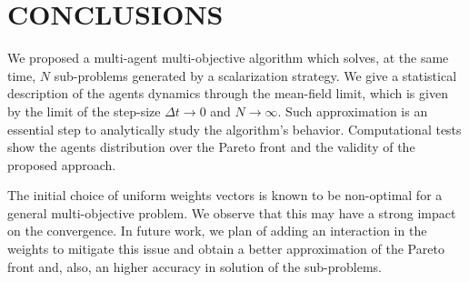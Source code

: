 \documentclass[letterpaper, 10 pt, conference]{ieeeconf}  %
\begin{document}
\section{CONCLUSIONS}
We proposed a multi-agent multi-objective algorithm which solves, at the same time, $N$ sub-problems generated by a scalarization strategy. We give a statistical description of the agents dynamics through the mean-field limit, which is given by the limit of the step-size $\Delta t \to 0$ and $N \to \infty$. Such approximation is an essential step to analytically study the algorithm's behavior.
Computational tests show the agents distribution over the Pareto front and the validity of the proposed approach.

The initial choice of uniform weights vectors is known to be non-optimal for a general multi-objective problem.  We observe that this may have a strong impact on the convergence. In future work, we plan of adding an interaction in the weights to mitigate this issue and obtain a better approximation of the Pareto front and, also, an higher accuracy in solution of the sub-problems.

{}
\end{document}
